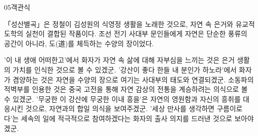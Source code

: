 \documentclass[fs85,seriesWit]{korfarm-base}
\begin{document}
\begin{kfQBlock}{05}{객관식}
\begin{kfEvidence}「성산별곡」은 정철이 김성원의 식영정 생활을 노래한 것으로, 자연 속 은거와 유교적 도학의 실천이 결합된 작품이다. 조선 전기 사대부 문인들에게 자연은 단순한 풍류의 공간이 아니라, 도(道)를 체득하는 수양의 장이었다.\end{kfEvidence}
\begin{kfChoices}
\kfChoice '이 내 생애 어떠한고'에서 화자가 자연 속 삶에 대해 자부심을 느끼는 것은 은거 생활의 가치를 인식한 것으로 볼 수 있겠군.
\kfChoice '강산이 좋다 한들 내 분인가 하노라'에서 화자가 겸양하는 것은 자연을 수양의 장으로 여기는 사대부의 태도와 연결되겠군.
\kfChoice 소동파의 적벽부를 인용한 것은 중국 고전을 통해 자연 감상의 전통을 계승하려는 의식으로 볼 수 있겠군.
\kfChoice '무궁한 이 강산에 무궁한 이내 흥을'은 자연의 영원함과 자신의 흥취를 대응시킨 것으로, 자연과의 합일 의식을 보여주겠군.
\kfChoice '세상 만사를 생각하면 구름이로다'는 세속의 일에 적극적으로 참여하겠다는 화자의 출사 의지를 드러낸 것으로 보아야겠군.
\end{kfChoices}
\end{kfQBlock}

\kfEndMC
\end{document}
